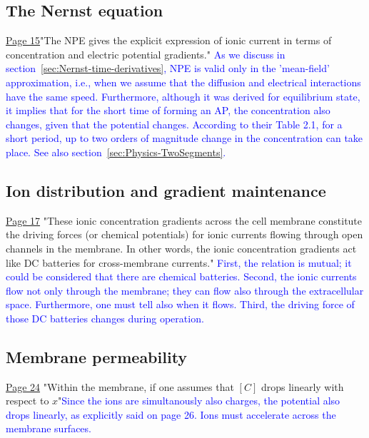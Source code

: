 \subsection{The Nernst equation\label{sec:Physics-NernstEquation}}
\href{https://rcweb.dartmouth.edu/~mvdm/wiki/lib/exe/fetch.php?media=analysis:johnstonwu.pdf}{Page 15}"The NPE gives the explicit expression of ionic current in terms of concentration and electric potential gradients." \textcolor{blue}{As we discuss in section~\ref{sec:Nernst-time-derivatives}, NPE is valid only in the 'mean-field' approximation, i.e., when we assume that the diffusion and electrical interactions have the same speed. Furthermore, although it was derived for equilibrium state, it implies that for the short time of forming an
AP, the concentration also changes, given that the potential changes. According to their Table 2.1, for a short period, up to two orders of magnitude change in the
concentration can take place. See also section~\ref{sec:Physics-TwoSegments}.
}

\subsection{Ion distribution and gradient maintenance\label{sec:Physics-IonDistribution}}
\href{https://rcweb.dartmouth.edu/~mvdm/wiki/lib/exe/fetch.php?media=analysis:johnstonwu.pdf}{Page 17} "These ionic concentration gradients across the cell membrane constitute the driving forces
(or chemical potentials) for ionic currents flowing through open channels
in the membrane. In other words, the ionic concentration gradients act
like DC batteries for cross-membrane currents."
\textcolor{blue}{First, the relation is mutual; it could be considered that
there are chemical batteries. Second, the  ionic currents flow not only through the membrane; they can flow also through the extracellular space. Furthermore, one must tell also when it flows. Third, the driving force
of those DC batteries changes during operation.
}

\subsection{Membrane permeability\label{sec:Physics-MembranePermeability}}
\href{https://rcweb.dartmouth.edu/~mvdm/wiki/lib/exe/fetch.php?media=analysis:johnstonwu.pdf}{Page 24} "Within the membrane, if one assumes that $[C]$ drops linearly with respect to $x$"\textcolor{blue}{Since the ions are simultanously also charges, the potential also drops linearly, as explicitly said on page 26. Ions must accelerate across the membrane surfaces.}


